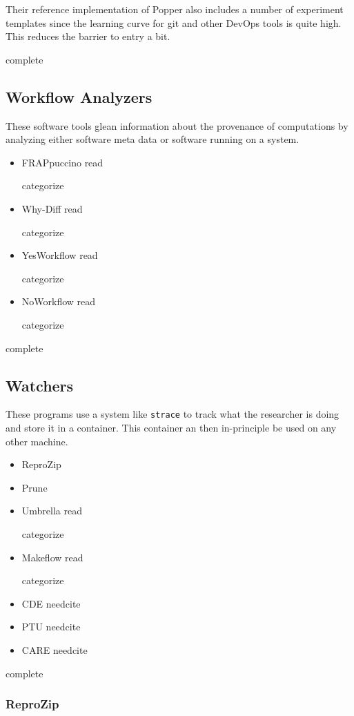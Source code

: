 \documentclass[american]{article}
\newcommand{\Read}{
	\gls{read}
}
\newcommand{\categorize}{
	\gls{categorize}
}
\newcommand{\complete}{
	\gls{complete}
}
\newcommand{\needcite}{
	\gls{needcite}
}
\begin{document}
Their reference implementation of Popper also includes a number of experiment templates since the learning curve for git and other DevOps tools is quite high. This reduces the barrier to entry a bit.

\complete

\subsection{Workflow Analyzers} \label{sec:software-analyzers}

These software tools glean information about the provenance of computations by analyzing either software meta data or software running on a system.

\begin{itemize}
\item FRAPpuccino \cite{FRAPpuccino} \Read \categorize
\item Why-Diff \cite{computational-meta-data} \Read \categorize
\item YesWorkflow \cite{computational-meta-data} \Read \categorize
\item NoWorkflow \cite{computational-meta-data} \Read \categorize
\end{itemize}

\complete

\subsection{Watchers} \label{sec:software-watchers}

These programs use a system like \texttt{strace} to track what the researcher is doing and store it in a container. This container an then in-principle be used on any other machine.

\begin{itemize}
\item ReproZip \cite{reprozip}
\item Prune \cite{Thain-Prune-2016}
\item Umbrella \cite{Thain-Umbrella-2016} \Read \categorize
\item Makeflow \cite{makeflow-2017} \Read \categorize
\item CDE \needcite
\item PTU \needcite
\item CARE \needcite
\end{itemize}

\complete

\subsubsection{ReproZip} \label{sec:reprozip}
\end{document}
